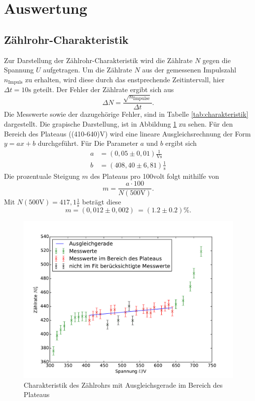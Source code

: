 \section{Auswertung}
\label{sec:Auswertung}

\subsection{Zählrohr-Charakteristik}

Zur Darstellung der Zählrohr-Charakteristik wird die Zählrate $N$ gegen die Spannung $U$ aufgetragen. Um die Zählrate $N$ aus der gemessenen Impulszahl $n_\mathrm{Impuls}$ zu erhalten, wird diese durch das enstprechende Zeitintervall, hier $\Delta t = 10\si{\second}$ geteilt. Der Fehler der Zählrate ergibt sich aus
\begin{equation}
  \label{eqn:fehler}
  \Delta N =\frac{\sqrt{n_\mathrm{Impulse}}}{\Delta t}.
\end{equation}
Die Messwerte sowie der dazugehörige Fehler, sind in Tabelle \ref{tab:charakteristik} dargestellt. Die grapische Darstellung, ist in Abbildung \ref{fig:plateau} zu sehen.
Für den Bereich des Plateaus ((410-640)\si{\volt}) wird eine lineare Ausgleichsrechnung der Form $y=ax+b$ durchgeführt. Für Die Parameter $a$ und $b$ ergibt sich
\begin{align}
  a&=(0,05 \pm 0,01)\frac{1}{\si{\volt\second}} \\
  b&=(408,40 \pm 6,81)\frac{1}{\si{\second}}
\end{align}
Die prozentuale Steigung $m$ des Plateaus pro 100\si{volt} folgt mithilfe von
\begin{equation}
  m=\frac{a\cdot 100}{N(500\si{\volt})}.
\end{equation}
Mit $N(500\si{\volt})= 417,1 \frac{1}{\si{\second}}$ beträgt diese
\begin{equation}
  m=(0,012 \pm 0,002)\ = (1.2 \pm 0.2) \%.
\end{equation}

\begin{figure}
  \centering
  \includegraphics[scale=0.8]{auswertung/plateau.pdf}
\caption{Charakteristik des Zählrohrs mit Ausgleichsgerade im Bereich des Plateaus}
  \label{fig:plateau}
\end{figure}

